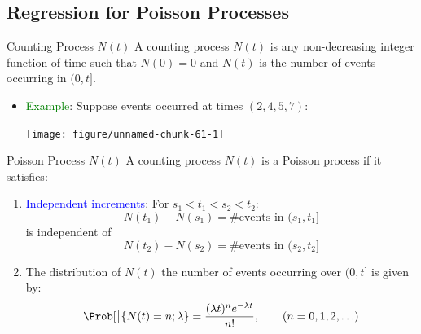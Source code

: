 \documentclass[oneside]{book}\usepackage[]{graphicx}\usepackage[svgnames]{xcolor}
\newenvironment{knitrout}{}{} %
\begin{document}
\subsection*{Regression for Poisson Processes}
\begin{Regular}{Counting Process $ N(t) $}
      A counting process $ N(t) $ is any non-decreasing integer function of time such that
      $ N(0)=0 $ and $ N(t) $ is the number of events occurring in $ (0,t] $.
\end{Regular}
\begin{itemize}
      \item \textcolor{Green}{Example}: Suppose events occurred at times $ (2,4,5,7) $:
\begin{knitrout}
\color{fgcolor}

{\centering \texttt{[image: figure/unnamed-chunk-61-1]} 

}


\end{knitrout}
\end{itemize}
\begin{Regular}{Poisson Process $ N(t) $}
      A counting process $ N(t) $ is a Poisson process if it satisfies:
      \begin{enumerate}[1.]
            \item \textcolor{Blue}{Independent increments}: For $ s_1<t_1<s_2<t_2 $:
                  \[ N(t_1)-N(s_1)=\text{\# events in $(s_1,t_1]$} \]
                  is independent of
                  \[ N(t_2)-N(s_2)=\text{\# events in $(s_2,t_2]$} \]
            \item The distribution of $ N(t) $ the number of events occurring over $ (0,t] $ is given by:
                  \[ \Prob[\big]{N(t)=n;\lambda}=\frac{(\lambda t)^n e^{-\lambda t}}{n!},\qquad (n=0,1,2,\ldots)  \]
      \end{enumerate}
\end{Regular}
\end{document}
